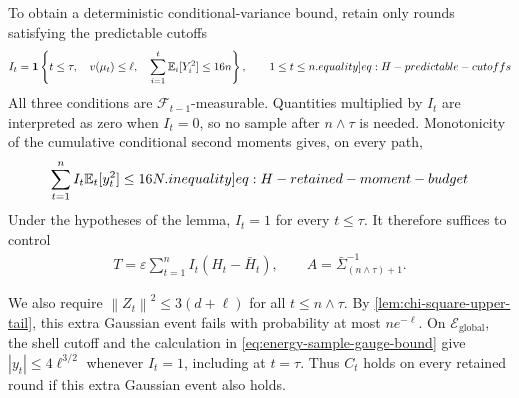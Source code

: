 \documentclass[12pt,cleveref]{jmlr}
\renewenvironment{proof}[1][\proofname]
{\par\noindent{\bfseries\upshape #1\ }}
{\jmlrQED}
\newcommand{\eqlabel}[1]{\label[equality]{#1}}
\newcommand{\ineqlabel}[1]{\label[inequality]{#1}}
\newcommand{\E}{\mathbb E}
\newcommand{\F}{\mathcal F}
\newcommand{\1}{\mathbf 1}
\newcommand{\eps}{\varepsilon}
\newcommand{\norm}[1]{\left\lVert #1\right\rVert}
\begin{document}
\begin{proof}
    To obtain a deterministic conditional-variance bound, retain only
    rounds satisfying the predictable cutoffs
    \begin{align}
        I_t=\1\left\{
            t\leq\tau,\quad v(\mu_t)\leq\ell,\quad
            \sum_{i=1}^t\E_i[Y_i^2]\leq16n
        \right\},\qquad 1\leq t\leq n.
        \eqlabel{eq:H-predictable-cutoffs}
    \end{align}
    All three conditions are $\F_{t-1}$-measurable. Quantities multiplied
    by $I_t$ are interpreted as zero when $I_t=0$, so no sample after
    $n\wedge\tau$ is needed. Monotonicity of the cumulative conditional
    second moments gives, on every path,
    \begin{align}
        \sum_{t=1}^n I_t\E_t[y_t^2]\leq16N.
        \ineqlabel{eq:H-retained-moment-budget}
    \end{align}
    Under the hypotheses of the lemma, $I_t=1$ for every $t\leq\tau$.
    It therefore suffices to control
    \begin{align}
        T=\eps\sum_{t=1}^n I_t(H_t-\bar{H}_t),
        \qquad A=\bar{\Sigma}_{(n\wedge\tau)+1}^{-1}.
    \end{align}

    We also require $\norm{Z_t}^2\leq3(d+\ell)$ for all
    $t\leq n\wedge\tau$. By \cref{lem:chi-square-upper-tail}, this
    extra Gaussian event fails with probability at most $ne^{-\ell}$.
    On $\mathcal E_{\mathrm{global}}$, the shell cutoff and the
    calculation in \cref{eq:energy-sample-gauge-bound} give
    $|y_t|\leq4\ell^{3/2}$ whenever $I_t=1$, including at $t=\tau$.
    Thus $C_t$ holds on every retained round if this extra Gaussian
    event also holds.


\end{proof}
\end{document}
